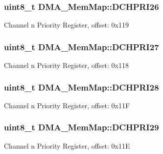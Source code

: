 \subsubsection[{D\+C\+H\+P\+R\+I26}]{\setlength{\rightskip}{0pt plus 5cm}uint8\+\_\+t D\+M\+A\+\_\+\+Mem\+Map\+::\+D\+C\+H\+P\+R\+I26}\label{struct_d_m_a___mem_map_af17011bb74643176e41ef82482747d0e}
Channel n Priority Register, offset\+: 0x119 \hypertarget{struct_d_m_a___mem_map_a54750bb00df4679829c608f6ee23dadc}{}
\subsubsection[{D\+C\+H\+P\+R\+I27}]{\setlength{\rightskip}{0pt plus 5cm}uint8\+\_\+t D\+M\+A\+\_\+\+Mem\+Map\+::\+D\+C\+H\+P\+R\+I27}\label{struct_d_m_a___mem_map_a54750bb00df4679829c608f6ee23dadc}
Channel n Priority Register, offset\+: 0x118 \hypertarget{struct_d_m_a___mem_map_ae38469ea2957f2187c96c385ff66fa68}{}
\subsubsection[{D\+C\+H\+P\+R\+I28}]{\setlength{\rightskip}{0pt plus 5cm}uint8\+\_\+t D\+M\+A\+\_\+\+Mem\+Map\+::\+D\+C\+H\+P\+R\+I28}\label{struct_d_m_a___mem_map_ae38469ea2957f2187c96c385ff66fa68}
Channel n Priority Register, offset\+: 0x11\+F \hypertarget{struct_d_m_a___mem_map_a5a09a06fd8ca598627150607ae8c3679}{}
\subsubsection[{D\+C\+H\+P\+R\+I29}]{\setlength{\rightskip}{0pt plus 5cm}uint8\+\_\+t D\+M\+A\+\_\+\+Mem\+Map\+::\+D\+C\+H\+P\+R\+I29}\label{struct_d_m_a___mem_map_a5a09a06fd8ca598627150607ae8c3679}
Channel n Priority Register, offset\+: 0x11\+E \hypertarget{struct_d_m_a___mem_map_ac11b0b7296f6e76f0d69fb0e87ced548}{}
